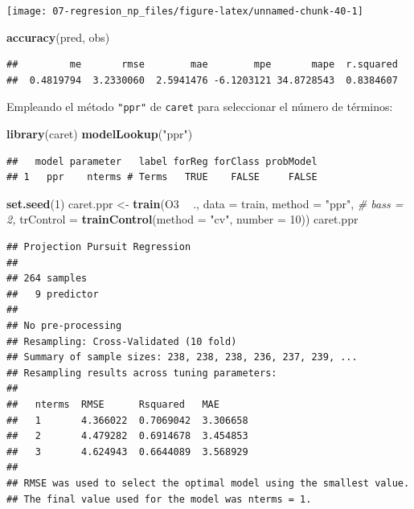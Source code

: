 \documentclass[
]{book}
\newenvironment{Shaded}{\begin{snugshade}}{\end{snugshade}}
\newcommand{\CommentTok}[1]{\textcolor[rgb]{0.56,0.35,0.01}{\textit{#1}}}
\newcommand{\DataTypeTok}[1]{\textcolor[rgb]{0.13,0.29,0.53}{#1}}
\newcommand{\DecValTok}[1]{\textcolor[rgb]{0.00,0.00,0.81}{#1}}
\newcommand{\KeywordTok}[1]{\textcolor[rgb]{0.13,0.29,0.53}{\textbf{#1}}}
\newcommand{\NormalTok}[1]{#1}
\newcommand{\OperatorTok}[1]{\textcolor[rgb]{0.81,0.36,0.00}{\textbf{#1}}}
\newcommand{\StringTok}[1]{\textcolor[rgb]{0.31,0.60,0.02}{#1}}
\theoremstyle{break}
\theoremstyle{definition}
\theoremstyle{definition}
\theoremstyle{definition}
\theoremstyle{remark}
\begin{document}
\begin{center}\texttt{[image: 07-regresion\_np\_files/figure-latex/unnamed-chunk-40-1]} \end{center}

\begin{Shaded}
\begin{Highlighting}[]
\KeywordTok{accuracy}\NormalTok{(pred, obs)}
\end{Highlighting}
\end{Shaded}

\begin{verbatim}
##         me       rmse        mae        mpe       mape  r.squared 
##  0.4819794  3.2330060  2.5941476 -6.1203121 34.8728543  0.8384607
\end{verbatim}

Empleando el método \texttt{"ppr"} de \texttt{caret} para seleccionar el número de términos:

\begin{Shaded}
\begin{Highlighting}[]
\KeywordTok{library}\NormalTok{(caret)}
\KeywordTok{modelLookup}\NormalTok{(}\StringTok{"ppr"}\NormalTok{)}
\end{Highlighting}
\end{Shaded}

\begin{verbatim}
##   model parameter   label forReg forClass probModel
## 1   ppr    nterms # Terms   TRUE    FALSE     FALSE
\end{verbatim}

\begin{Shaded}
\begin{Highlighting}[]
\KeywordTok{set.seed}\NormalTok{(}\DecValTok{1}\NormalTok{)}
\NormalTok{caret.ppr <-}\StringTok{ }\KeywordTok{train}\NormalTok{(O3 }\OperatorTok{~}\StringTok{ }\NormalTok{., }\DataTypeTok{data =}\NormalTok{ train, }\DataTypeTok{method =} \StringTok{"ppr"}\NormalTok{, }\CommentTok{# bass = 2,}
    \DataTypeTok{trControl =} \KeywordTok{trainControl}\NormalTok{(}\DataTypeTok{method =} \StringTok{"cv"}\NormalTok{, }\DataTypeTok{number =} \DecValTok{10}\NormalTok{))}
\NormalTok{caret.ppr}
\end{Highlighting}
\end{Shaded}

\begin{verbatim}
## Projection Pursuit Regression 
## 
## 264 samples
##   9 predictor
## 
## No pre-processing
## Resampling: Cross-Validated (10 fold) 
## Summary of sample sizes: 238, 238, 238, 236, 237, 239, ... 
## Resampling results across tuning parameters:
## 
##   nterms  RMSE      Rsquared   MAE     
##   1       4.366022  0.7069042  3.306658
##   2       4.479282  0.6914678  3.454853
##   3       4.624943  0.6644089  3.568929
## 
## RMSE was used to select the optimal model using the smallest value.
## The final value used for the model was nterms = 1.
\end{verbatim}
\end{document}
